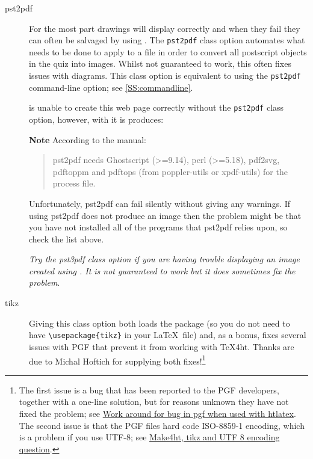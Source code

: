 \documentclass[svgnames]{article}
\begin{document}
\begin{description}
  \item[pst2pdf] 
    For the most part  drawings will display correctly and
    when they fail they can often be salvaged by using . The
    \Verb|pst2pdf| class option automates what needs to be done to apply
     to a \MathQuiz file in order to convert all postscript objects in the
    quiz into images. Whilst not guaranteed to work, this often fixes
    issues with  diagrams. This class option is
    equivalent to using the \Verb|pst2pdf| command-line option; see
    \autoref{SS:commandline}.

    

    \MathQuiz is unable to create this web page correctly without the \Verb|pst2pdf| class option, however, with it is produces:


    \noindent
    \textbf{Note} According to the  manual:

    \begin{quote}
      \textsf{pst2pdf} needs Ghostscript (>=9.14), perl (>=5.18), pdf2svg, pdftoppm
      and pdftops (from poppler-utils or xpdf-utils) for the process file.
    \end{quote}

    Unfortunately, \textsf{pst2pdf} can fail silently without giving any warnings. If
    using \textsf{pst2pdf} does not produce an image then the problem
    might be that you have not installed all of the programs that
    \textsf{pst2pdf} relies upon, so check the list above.

    \textit{Try the pst3pdf class option if you are having trouble
    displaying an image created using . It is not
    guaranteed to work but it does sometimes fix the problem}.

  \item[tikz]
    Giving this class option both loads the  package (so
    you do not need to have \Verb|\usepackage{tikz}| in your \LaTeX\ file)
    and, as a bonus, fixes several issues with PGF that prevent it from
    working with \TeX 4ht. Thanks are due to Michal Hoftich for supplying
    both fixes!\footnote{The first issue is a bug that has been reported
    to the PGF developers, together with a one-line solution, but for
    reasons unknown they have not fixed the problem; see
    \href{https://tex.stackexchange.com/questions/386757}{Work around for
    bug in pgf when used with htlatex}.  The second issue is that the PGF
    files hard code \textsf{ISO-8859-1} encoding, which is a problem if
    you use UTF-8; see
    \href{https://tex.stackexchange.com/questions/390421}{Make4ht, tikz
    and UTF 8 encoding question}.  }


\end{description}
\end{document}
